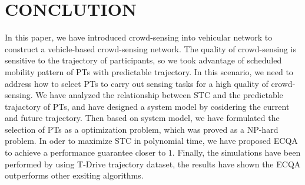 \documentclass[journal]{IEEEtran}
\begin{document}
\section{CONCLUTION}
In this paper, we have introduced crowd-sensing into vehicular network to construct a vehicle-based crowd-sensing network. The quality of crowd-sensing is sensitive to the trajectory of participants, so we took advantage of scheduled mobility pattern of PTs with predictable trajectory. In this scenario, we need to address how to select PTs to carry out sensing tasks for a high quality of crowd-sensing.
We have analyzed the relationship between STC and the predictable trajactory of PTs, and have designed a system model by cosidering the current and future trajectory. Then based on system model, we have formulated the selection of PTs as a optimization problem, which was proved as a NP-hard problem. In oder to maximize STC in polynomial time, we have proposed ECQA to achieve a performance guarantee closer to $1$. Finally, the simulations have been performed by using T-Drive trajectory dataset, the results have shown the ECQA outperforms other exsiting algorithms.















%
%
\end{document}
